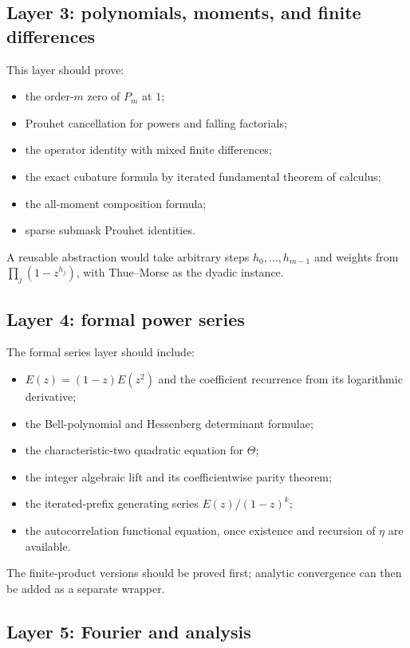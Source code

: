 \documentclass[11pt,oneside]{article}
\theoremstyle{definition}
\theoremstyle{remark}
\begin{document}
\subsection{Layer 3: polynomials, moments, and finite differences}

This layer should prove:
\begin{itemize}
 \item the order-$m$ zero of $P_m$ at $1$;
 \item Prouhet cancellation for powers and falling factorials;
 \item the operator identity with mixed finite differences;
 \item the exact cubature formula by iterated fundamental theorem of calculus;
 \item the all-moment composition formula;
 \item sparse submask Prouhet identities.
\end{itemize}
A reusable abstraction would take arbitrary steps $h_0,\ldots,h_{m-1}$ and
weights from $\prod_j(1-z^{h_j})$, with Thue--Morse as the dyadic instance.

\subsection{Layer 4: formal power series}

The formal series layer should include:
\begin{itemize}
 \item $E(z)=(1-z)E(z^2)$ and the coefficient recurrence from its logarithmic
       derivative;
 \item the Bell-polynomial and Hessenberg determinant formulae;
 \item the characteristic-two quadratic equation for $\Theta$;
 \item the integer algebraic lift and its coefficientwise parity theorem;
 \item the iterated-prefix generating series $E(z)/(1-z)^k$;
 \item the autocorrelation functional equation, once existence and recursion
       of $\eta$ are available.
\end{itemize}
The finite-product versions should be proved first; analytic convergence can
then be added as a separate wrapper.

\subsection{Layer 5: Fourier and analysis}
\end{document}
